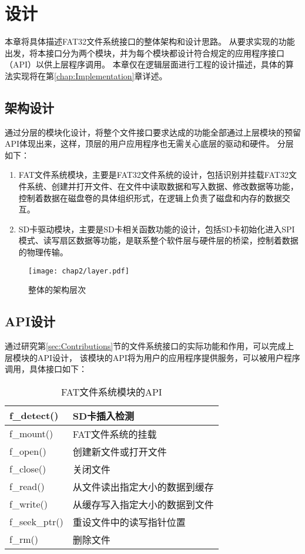 
\chapter{设计}
\label{chap:Design}
本章将具体描述FAT32文件系统接口的整体架构和设计思路。
从要求实现的功能出发，将本接口分为两个模块，并为每个模块都设计符合规定的应用程序接口（API）以供上层程序调用。
本章仅在逻辑层面进行工程的设计描述，具体的算法实现将在第\ref{chap:Implementation}章详述。

\section{架构设计}
\label{sec:Architecture}
通过分层的模块化设计，将整个文件接口要求达成的功能全部通过上层模块的预留API体现出来，这样，顶层的用户应用程序也无需关心底层的驱动和硬件。
分层如下：
\begin{enumerate}[noitemsep,topsep=0pt,parsep=0pt,partopsep=0pt]
    \item
FAT文件系统模块，主要是FAT32文件系统的设计，包括识别并挂载FAT32文件系统、创建并打开文件、在文件中读取数据和写入数据、修改数据等功能，
控制着数据在磁盘卷的具体组织形式，在逻辑上负责了磁盘和内存的数据交互。
    \item
SD卡驱动模块，主要是SD卡相关函数功能的设计，包括SD卡初始化进入SPI模式、读写扇区数据等功能，是联系整个软件层与硬件层的桥梁，控制着数据的物理传输。
\end{enumerate}

\begin{figure}[!htb]
    \centering
    \texttt{[image: chap2/layer.pdf]}
    \\
    \caption{整体的架构层次}\label{fig:specflow}
\end{figure}

\section{API设计}
\label{sec:API}
通过研究第\ref{sec:Contributions}节的文件系统接口的实际功能和作用，可以完成上层模块的API设计，
该模块的API将为用户的应用程序提供服务，可以被用户程序调用，具体接口如下：
\begin{longtable}[!htb]{ll}
\caption{FAT文件系统模块的API} \label{tab:fatapi}\\
    \toprule
    f\_detect() & SD卡插入检测 \\ \midrule
    f\_mount() & FAT文件系统的挂载\\ \midrule
    f\_open() & 创建新文件或打开文件\\ \midrule
    f\_close() & 关闭文件\\ \midrule
    f\_read() & 从文件读出指定大小的数据到缓存\\ \midrule
    f\_write() & 从缓存写入指定大小的数据到文件\\ \midrule
    f\_seek\_ptr() & 重设文件中的读写指针位置\\ \midrule
    f\_rm() & 删除文件\\
    \bottomrule
\end{longtable}

